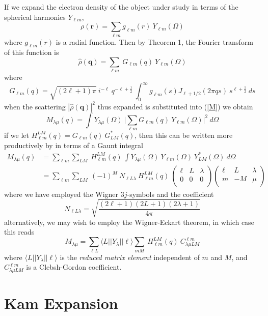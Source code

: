 \documentclass[aps,prl,preprint,groupedaddress]{revtex4-1}
\def\*#1{\mathbf{#1}}
\begin{document}
If we expand the electron density of the object under study in terms of the spherical harmonics $Y_{\ell m}$,
\[
\rho( \*r ) = \sum_{\ell m} g_{\ell m} (r) \> Y_{\ell m}(\Omega)
\]
where $g_{\ell m} (r)$ is a radial function. Then by Theorem 1, the Fourier transform of this function is
\[
\hat{\rho} (\*q) = \sum_{\ell m} \> G_{\ell m} (q) \> Y_{\ell m}(\Omega)
\]
where
\[
G_{\ell m} (q) = \sqrt{ (2 \ell + 1) \pi} \> i^{-\ell} \> q^{- \ell + \frac{1}{2} } \> \int_0^{\infty} g_{\ell m} (s) J_{\ell + 1/2} (2 \pi q s) \> s^{\ell + \frac{1}{2}} \> ds
\]
when the scattering $| \hat{\rho}(\*q) |^2$ thus expanded is substituted into (\ref{M}) we obtain
\[
M_{\lambda \mu}(q) = \int Y_{\lambda \mu} (\Omega) \> \Big|
\sum_{\ell m} G_{\ell m} (q) \> Y_{\ell m}(\Omega)
\Big|^2 \> d\Omega
\]
if we let $H^{LM}_{\ell m} (q) = G_{\ell m}(q) \> G_{L M}^* (q)$, then this can be written more productively by in terms of a Gaunt integral
\begin{align*}
M_{\lambda \mu}(q) &= \sum_{\ell m} \sum_{L M} \> H^{LM}_{\ell m} (q) \>
\int Y_{\lambda \mu} (\Omega) \> Y_{\ell m} (\Omega) \> Y_{LM}^* (\Omega) \> d\Omega \\
&= \sum_{\ell m} \sum_{L M} \> (-1)^M \> N_{\ell L \lambda} \> H^{LM}_{\ell m} (q) \>
\left( \begin{array}{ccc}
\ell & L & \lambda \\
0 & 0 & 0 \\
\end{array} \right)
\left( \begin{array}{ccc}
\ell & L & \lambda \\
m & -M & \mu \\
\end{array} \right)
\end{align*}
where we have employed the Wigner $3j$-symbols and the coefficient
\[
N_{\ell L \lambda} = \sqrt{ \frac{(2 \ell + 1)(2 L + 1)(2 \lambda + 1)}{4 \pi} }
\]
alternatively, we may wish to employ the Wigner-Eckart theorem, in which case this reads
\[
M_{\lambda \mu} = \sum_{\ell L} \langle L || Y_\lambda || \ell \rangle 
\sum_{m M} \> H^{LM}_{\ell m} (q) \>  C^{\ell m}_{\lambda \mu LM}
\]
where $\langle L || Y_\lambda || \ell \rangle$ is the \emph{reduced matrix element} independent of $m$ and $M$, and $C^{\ell m}_{\lambda \mu LM}$ is a Clebsh-Gordon coefficient.


\section{Kam Expansion}
\end{document}

